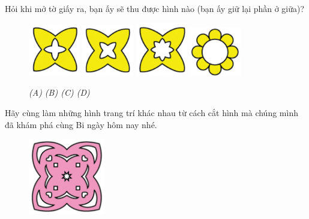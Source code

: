 Hỏi khi mở tờ giấy ra, bạn ấy sẽ thu được hình nào (bạn ấy giữ lại phần ở giữa)?
\begin{figure}[H]
	\centering
	\captionsetup{labelformat=empty}
	\vspace*{-5pt}
	\captionsetup{justification=centering}
	\includegraphics[width =0.2\textwidth]{cat-17a}
	\hfill
	\includegraphics[width =0.2\textwidth]{cat-17b}
	\hfill
	\includegraphics[width =0.2\textwidth]{cat-17c}
	\hfill
	\includegraphics[width =0.2\textwidth]{cat-17d}
	\caption{\small \it (A)\hspace*{40pt} (B)\hspace*{65pt} (C) \hspace*{40pt} (D)}	
	\vspace*{-10pt}
\end{figure}
\begin{multicols}{2}
	Hãy cùng làm những hình trang trí khác nhau từ cách cắt  hình mà chúng mình  đã khám phá cùng Bi ngày hôm nay nhé.
	\begin{figure}[H]
		\vspace*{-5pt}	
		\captionsetup{labelformat=empty}
		\centering
		\captionsetup{justification=raggedleft}
		\includegraphics[width =0.3\textwidth]{cat-18}
		\vspace*{-10pt}
	\end{figure}
\end{multicols}
